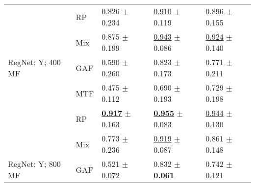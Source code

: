 \begin{tabular}{lllll}
 & RP & \textcolor[rgb]{0.1764705882,0.5000000000,0}{0.826} $\pm$ \textcolor[rgb]{0.8366600265,0.1633399735,0}{0.234} & \underline{\textcolor[rgb]{0.1487383798,0.5000000000,0}{0.910}} $\pm$ \textcolor[rgb]{0.3227135493,0.5000000000,0}{0.119} & \textcolor[rgb]{0.2297120419,0.5000000000,0}{0.896} $\pm$ \textcolor[rgb]{0.2675465965,0.5000000000,0}{0.155} \\
 & Mix & \textcolor[rgb]{0.0808823529,0.5000000000,0}{0.875} $\pm$ \textcolor[rgb]{0.7127864450,0.2872135550,0}{0.199} & \underline{\textcolor[rgb]{0.0398406375,0.5000000000,0}{0.943}} $\pm$ \textcolor[rgb]{0.1408376023,0.5000000000,0}{0.086} & \underline{\textcolor[rgb]{0.1433246073,0.5000000000,0}{0.924}} $\pm$ \textcolor[rgb]{0.1910808871,0.5000000000,0}{0.140} \\
RegNet: Y; 400 MF & GAF & \textcolor[rgb]{0.6335784314,0.3664215686,0}{0.590} $\pm$ \textcolor[rgb]{0.9285640435,0.0714359565,0}{0.260} & \textcolor[rgb]{0.4409030544,0.5000000000,0}{0.823} $\pm$ \textcolor[rgb]{0.6253561540,0.3746438460,0}{0.173} & \textcolor[rgb]{0.6184554974,0.3815445026,0}{0.771} $\pm$ \textcolor[rgb]{0.5365885567,0.4634114433,0}{0.211} \\
 & MTF & \textcolor[rgb]{0.8573529412,0.1426470588,0}{0.475} $\pm$ \textcolor[rgb]{0.3995965707,0.5000000000,0}{0.112} & \textcolor[rgb]{0.8871181939,0.1128818061,0}{0.690} $\pm$ \textcolor[rgb]{0.7368704913,0.2631295087,0}{0.193} & \textcolor[rgb]{0.7480366492,0.2519633508,0}{0.729} $\pm$ \textcolor[rgb]{0.4763768270,0.5000000000,0}{0.198} \\
 & RP & \underline{\textbf{\textcolor[rgb]{0.0000000000,0.5000000000,0}{0.917}}} $\pm$ \textcolor[rgb]{0.5819876952,0.4180123048,0}{0.163} & \underline{\textbf{\textcolor[rgb]{0.0000000000,0.5000000000,0}{0.955}}} $\pm$ \textcolor[rgb]{0.1234823448,0.5000000000,0}{0.083} & \underline{\textcolor[rgb]{0.0785340314,0.5000000000,0}{0.944}} $\pm$ \textcolor[rgb]{0.1425478198,0.5000000000,0}{0.130} \\
 & Mix & \textcolor[rgb]{0.2794117647,0.5000000000,0}{0.773} $\pm$ \textcolor[rgb]{0.8433802953,0.1566197047,0}{0.236} & \underline{\textcolor[rgb]{0.1195219124,0.5000000000,0}{0.919}} $\pm$ \textcolor[rgb]{0.1448309804,0.5000000000,0}{0.087} & \textcolor[rgb]{0.3376963351,0.5000000000,0}{0.861} $\pm$ \textcolor[rgb]{0.2311964710,0.5000000000,0}{0.148} \\
RegNet: Y; 800 MF & GAF & \textcolor[rgb]{0.7683823529,0.2316176471,0}{0.521} $\pm$ \textcolor[rgb]{0.2579384773,0.5000000000,0}{0.072} & \textcolor[rgb]{0.4095617530,0.5000000000,0}{0.832} $\pm$ \textbf{\textcolor[rgb]{0.0000000000,0.5000000000,0}{0.061}} & \textcolor[rgb]{0.7091623037,0.2908376963,0}{0.742} $\pm$ \textcolor[rgb]{0.0987377946,0.5000000000,0}{0.121} \\

\end{tabular}
